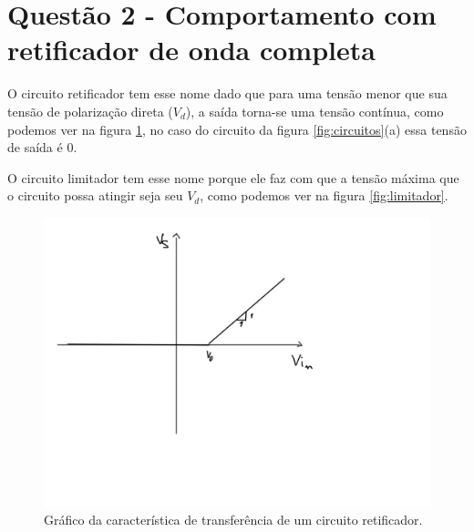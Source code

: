 \documentclass{abntex2}
\begin{document}
\section{Questão 2 - Comportamento com retificador de onda completa}


O circuito retificador tem esse nome dado que para uma tensão menor que sua tensão de polarização direta ($V_d$), a saída torna-se uma tensão contínua, como podemos ver na figura \ref{fig:retificador}, no caso do circuito da figura \ref{fig:circuitos}(a) essa tensão de saída é 0.

O circuito limitador tem esse nome porque ele faz com que a tensão máxima que o circuito possa atingir seja seu $V_d$, como podemos ver na figura \ref{fig:limitador}.

\begin{figure}[h]
  \centering
  \includegraphics[scale = 0.2]{grafRetificador.jpeg}
  \caption{Gráfico da característica de transferência de um circuito retificador.}
  \label{fig:retificador}
\end{figure}
\end{document}
